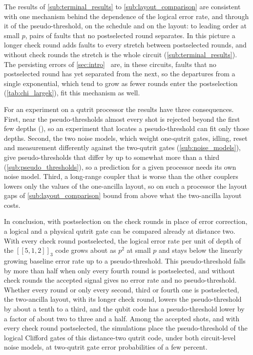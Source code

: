 The results of \autoref{sub:terminal_results} to \autoref{sub:layout_comparison} are consistent with one mechanism behind the dependence of the logical error rate, and through it of the pseudo-threshold, on the schedule and on the layout: to leading order at small $p$, pairs of faults that no postselected round separates. In this picture a longer check round adds faults to every stretch between postselected rounds, and without check rounds the stretch is the whole circuit (\autoref{sub:terminal_results}). The persisting errors of \autoref{sec:intro}~\cite{Ziyad2025} are, in these circuits, faults that no postselected round has yet separated from the next, so the departures from a single exponential, which tend to grow as fewer rounds enter the postselection (\autoref{tab:chi_largek}), fit this mechanism as well.

For an experiment on a qutrit processor the results have three consequences. First, near the pseudo-thresholds almost every shot is rejected beyond the first few depths (), so an experiment that locates a pseudo-threshold can fit only those depths. Second, the two noise models, which weight one-qutrit gates, idling, reset and measurement differently against the two-qutrit gates (\autoref{sub:noise_models}), give pseudo-thresholds that differ by up to somewhat more than a third (\autoref{sub:pseudo_thresholds}), so a prediction for a given processor needs its own noise model. Third, a long-range coupler that is worse than the other couplers lowers only the values of the one-ancilla layout, so on such a processor the layout gaps of \autoref{sub:layout_comparison} bound from above what the two-ancilla layout costs.

In conclusion, with postselection on the check rounds in place of error correction, a logical and a physical qutrit gate can be compared already at distance two. With every check round postselected, the logical error rate per unit of depth of the $[[5,1,2]]_3$ code grows about as $p^2$ at small $p$ and stays below the linearly growing baseline error rate up to a pseudo-threshold. This pseudo-threshold falls by more than half when only every fourth round is postselected, and without check rounds the accepted signal gives no error rate and no pseudo-threshold. Whether every round or only every second, third or fourth one is postselected, the two-ancilla layout, with its longer check round, lowers the pseudo-threshold by about a tenth to a third, and the qubit code has a pseudo-threshold lower by a factor of about two to three and a half. Among the accepted shots, and with every check round postselected, the simulations place the pseudo-threshold of the logical Clifford gates of this distance-two qutrit code, under both circuit-level noise models, at two-qutrit gate error probabilities of a few percent.

